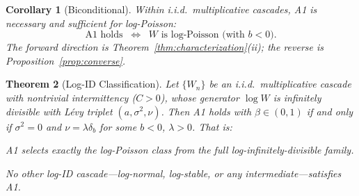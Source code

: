 \documentclass[12pt]{amsart}
\newtheorem{theorem}{Theorem}
\newtheorem{corollary}[theorem]{Corollary}
\theoremstyle{definition}
\theoremstyle{remark}
\begin{document}
\begin{corollary}[Biconditional]\label{cor:biconditional}
Within i.i.d.\ multiplicative cascades, A1 is necessary and
sufficient for log-Poisson:
\[
  \text{A1 holds}
  \;\;\Longleftrightarrow\;\;
  W \text{ is log-Poisson (with } b < 0\text{).}
\]
The forward direction is
Theorem~\textup{\ref{thm:characterization}(ii)}; the reverse is
Proposition~\textup{\ref{prop:converse}}.
\end{corollary}


\begin{theorem}[Log-ID Classification]\label{thm:classification}
Let $\{W_n\}$ be an i.i.d.\ multiplicative cascade with nontrivial
intermittency ($C > 0$), whose generator $\log W$ is infinitely
divisible with L\'evy triplet $(a, \sigma^2, \nu)$.  Then A1 holds
with $\beta \in (0,1)$ if and only if $\sigma^2 = 0$ and $\nu =
\lambda\delta_b$ for some $b < 0$, $\lambda > 0$.  That is:
\begin{center}
\emph{A1 selects exactly the log-Poisson class from the full
log-infinitely-divisible family.}
\end{center}
No other log-ID cascade---log-normal, log-stable, or any
intermediate---satisfies A1.
\end{theorem}
\end{document}
